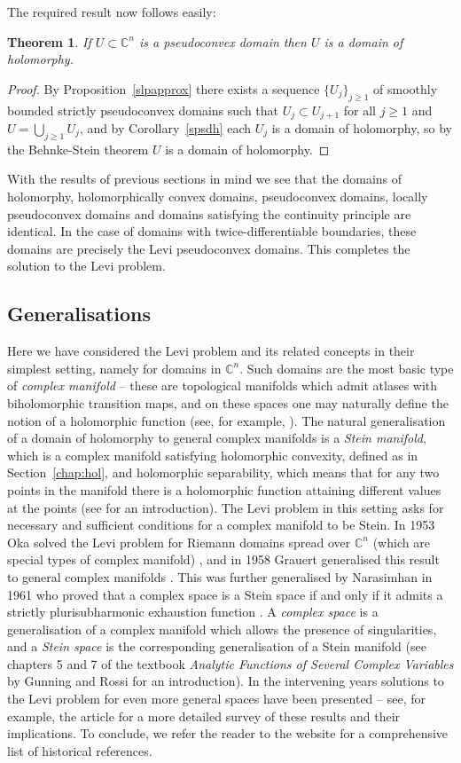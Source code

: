 \documentclass[11pt,a4paper, final, twoside]{article}
\newtheorem{theorem}{Theorem}
\numberwithin{equation}{section}
\newcommand{\C}{\mathbb C}
\begin{document}
The required result now follows easily:
\begin{theorem}
If $U\subset\C^n$ is a pseudoconvex domain then $U$ is a domain of holomorphy.
\end{theorem}
\begin{proof}
By Proposition~\ref{slpapprox} there exists a sequence $\{U_j\}_{j\geq 1}$ of smoothly bounded strictly pseudoconvex domains 
such that $U_j\subset U_{j+1}$ for all $j\geq 1$ and $U=\bigcup_{j\geq 1}U_j$, and by Corollary~\ref{spsdh} each $U_j$ is a domain of holomorphy, so by the Behnke-Stein theorem $U$ is a domain
of holomorphy.
\end{proof}
With the results of previous sections in mind we see that the domains of holomorphy, holomorphically convex domains, 
pseudoconvex domains,
locally pseudoconvex domains and domains satisfying the continuity principle are
identical. In the case of domains with twice-differentiable boundaries, these domains are precisely the Levi pseudoconvex domains. This completes the solution to the Levi problem.
\subsection{Generalisations}
\label{sec:concl}
Here we have considered the Levi problem and its related concepts 
in their simplest setting, namely for domains in $\C^n$. Such domains are the most basic type of \emph{complex manifold} -- these are
topological manifolds which admit atlases with biholomorphic transition maps, and on these spaces one may naturally define the notion of a holomorphic function
(see, for example, \cite[subsection 12]{itca}). The natural generalisation of a domain
of holomorphy to general complex manifolds is a \emph{Stein manifold}, which is a complex manifold satisfying holomorphic convexity, defined as in Section~\ref{chap:hol}, and
holomorphic separability, which means that for any two points in the manifold there is a holomorphic function attaining different values at the points (see \cite[page 223]{itca}
for an introduction).
The Levi problem
in this setting asks for necessary and sufficient conditions for a complex manifold to be Stein. In 1953 Oka solved the Levi problem for Riemann domains spread over $\C^n$ (which are special
types of complex manifold) \cite{oka}, and in 1958 Grauert generalised this result to general complex manifolds \cite{grauert58}.  
This was further generalised by Narasimhan in 1961 who proved that a complex space is a Stein space if and only if it admits a strictly plurisubharmonic exhaustion function \cite{narasimhan}. 
A \emph{complex space} is a generalisation of a complex manifold which allows the presence of singularities, and a \emph{Stein space} is the corresponding generalisation of a Stein manifold (see
chapters 5 and 7 of
the textbook \emph{Analytic Functions of Several Complex Variables} by Gunning and Rossi \cite{gunning} for an introduction). In the intervening years solutions to the Levi problem
for even more general spaces have been presented -- see, for example, the article \cite{siu} for a more detailed survey of these results and their implications. To conclude, we refer the reader to the
website \cite{website} for a comprehensive list of historical references.
\end{document}

